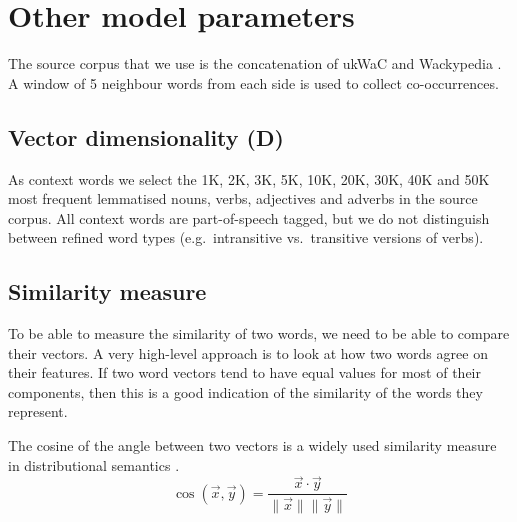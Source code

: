 \section{Other model parameters}
\label{sec:other-model-paramt}



The source corpus that we use is the concatenation of ukWaC and Wackypedia \cite{ukwac}.\footnotemark{} A window of 5 neighbour words from each side is used to collect co-occurrences.
%
%


\subsection{Vector dimensionality (D)}
\label{sec:vect-dimens}

As context words we select the 1K, 2K, 3K, 5K, 10K, 20K, 30K, 40K and 50K most frequent lemmatised nouns, verbs, adjectives and adverbs in the source corpus. All context words are part-of-speech tagged, but we do not distinguish between refined word types (e.g.~intransitive vs.~transitive versions of verbs).

\subsection{Similarity measure}
\label{sec:similarity-measure}

To be able to measure the similarity of two words, we need to be able to compare their vectors. A very high-level approach is to look at how two words agree on their features. If two word vectors tend to have equal values for most of their components, then this is a good indication of the similarity of the words they represent.

The cosine of the angle between two vectors is a widely used similarity measure in distributional semantics \cite{Turney:2010:FMV:1861751.1861756,lapesa2014large}.
%
\begin{equation*}
  \label{eq:cos}
  \cos(\vec{x}, \vec{y}) = \frac{\vec{x} \cdot \vec{y}}
                                {\|\vec{x}\| \|\vec{y}\|}
\end{equation*}

